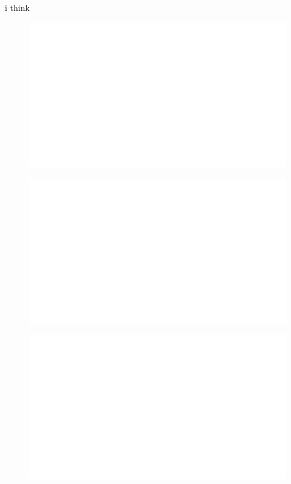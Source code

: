 i think


\begin{centering}
    \begin{figure}[h]
        \centering
        \includegraphics[width=\textwidth]{whyareyoucheckingthenameofthisfile.png}
    \end{figure}
\end{centering}

\begin{centering}
    \begin{figure}[h!]
        \centering
        \includegraphics[width=\textwidth]{whyareyoucheckingthenameofthisfile.png}
    \end{figure}
\end{centering}

\begin{centering}
    \begin{figure}[h]
        \centering
        \includegraphics[width=\textwidth]{whyareyoucheckingthenameofthisfile.png}
    \end{figure}
\end{centering}

